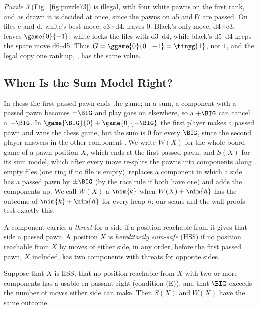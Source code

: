 \emph{Puzzle 3} (Fig.~\ref{fig:puzzle73}) is illegal, with four white pawns on the first rank, and as drawn it
is decided at once, since the pawns on a5 and f7 are passed. On files c and d, white's best move, c3$\times$d4,
leaves $0$. Black's only move, d4$\times$c3, leaves $\game{0}{-1}$: white locks the files with d3--d4, while
black's d5--d4 keeps the spare move d6--d5. Thus $G=\ggame{0}{0\mid -1}=\tinyg{1}$, not $1$, and the legal copy
one rank up, , has the same value.

\subsection{When Is the Sum Model Right?}\label{sec:sums-hss}

In chess the first passed pawn ends the game; in a sum, a component with a passed pawn becomes $\pm\BIG$ and
play goes on elsewhere, so a $+\BIG$ can cancel a $-\BIG$. In $\game{\BIG}{0}+\game{0}{-\BIG}$ the first player
makes a passed pawn and wins the chess game, but the sum is $0$ for every $\BIG$, since the second player
answers in the other component . We write $W(X)$ for the whole-board game of a pawn position $X$, which ends at
the first passed pawn, and $S(X)$ for its sum model, which after every move re-splits the pawns into components
along empty files (one ring if no file is empty), replaces a component in which a side has a passed pawn by
$\pm\BIG$ (by the race rule if both have one) and adds the components up. We call $W(X)$ a $\nim{k}$ when $W(X)+\nim{h}$ has
the outcome of $\nim{k}+\nim{h}$ for every heap $h$; our scans and the wall proofs test exactly this.

\begin{definition}\label{def:hss}
A component carries a \emph{threat} for a side if a position reachable from it gives that side a passed pawn. A
position $X$ is \emph{hereditarily sum-safe} (HSS) if no position reachable from $X$ by moves of either side,
in any order, before the first passed pawn, $X$ included, has two components with threats for opposite sides.
\end{definition}

\begin{theorem}\label{thm:hss}
Suppose that $X$ is HSS, that no position reachable from $X$ with two or more components has a usable en
passant right (condition (E)), and that $\BIG$ exceeds the number of moves either side can make. Then $S(X)$ and $W(X)$ have the same
outcome.
\end{theorem}

